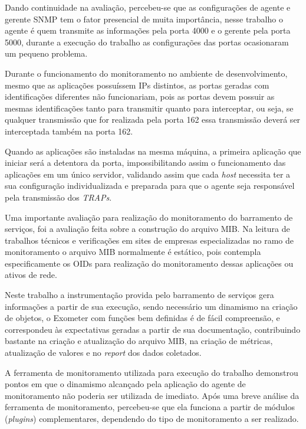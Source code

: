 Dando continuidade na avaliação, percebeu-se que as configurações de agente e gerente \acrshort{SNMP} tem o fator presencial de muita importância, nesse trabalho o agente é quem transmite as informações pela porta 4000 e o gerente pela porta 5000, durante a execução do trabalho as configurações das portas ocasionaram um pequeno problema. 

Durante o funcionamento do monitoramento no ambiente de desenvolvimento, mesmo que as aplicações possuíssem \acrshort{IP}s distintos, as portas geradas com identificações diferentes não funcionariam, pois as portas devem possuir as mesmas identificações tanto para transmitir quanto para interceptar, ou seja, se qualquer transmissão que for realizada pela porta 162 essa transmissão deverá ser interceptada também na porta 162. 

Quando as aplicações são instaladas na mesma máquina, a primeira aplicação que iniciar será a detentora da porta, impossibilitando assim o funcionamento das aplicações em um único servidor, validando assim que cada \textit{host} necessita ter a sua configuração individualizada e preparada para que o agente seja responsável pela transmissão dos \textit{TRAPs}. 

Uma importante avaliação para realização do monitoramento do barramento de serviços, foi a avaliação feita sobre a construção do arquivo MIB. Na leitura de trabalhos técnicos e verificações em sites de empresas especializadas no ramo de monitoramento o arquivo MIB normalmente é estático, pois contempla especificamente os \acrshort{OID}s para realização do monitoramento dessas aplicações ou ativos de rede. 

Neste trabalho a instrumentação provida pelo barramento de serviços gera informações a partir de sua execução, sendo necessário um dinamismo na criação de objetos, o Exometer com funções bem definidas é de fácil compreensão, e correspondeu às expectativas geradas a partir de sua documentação, contribuindo bastante na criação e atualização do arquivo MIB, na criação de métricas, atualização de valores e no \textit{report} dos dados coletados.  

A ferramenta de monitoramento utilizada para execução do trabalho demonstrou pontos em que o dinamismo alcançado pela aplicação do agente de monitoramento não poderia ser utilizada de imediato. Após uma breve análise da ferramenta de monitoramento, percebeu-se que ela funciona a partir de módulos (\textit{plugins}) complementares, dependendo do tipo de monitoramento a ser realizado. 

